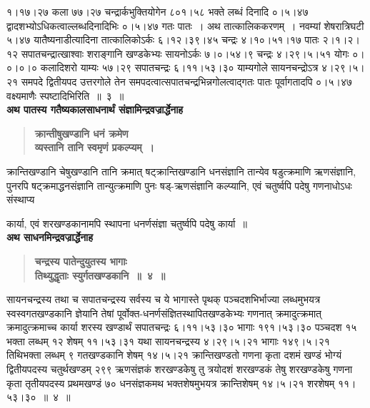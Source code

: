 \documentclass[11pt, openany]{book}
\begin{document}
\begin{sloppypar}
\noindent १।१७।२७ कला ७७।२७ चन्द्रार्कभुक्तियोगेन ८०१।५८ भक्ते लब्धं दिनादि ०।५।४७ द्वादशभ्योऽधिकत्वाल्लब्धदिनादिभिः ०।५।४७ गतः पातः~। अथ तात्कालिककरणम्~। नवम्यां शेषरात्रिघटी ५।४७ यातैष्यनाडीत्यादिना तात्कालिकोऽर्कः ६।१२।३९।४५ चन्द्रः ४।१०।५१।१७ पातः २।१।२।१२ सपातचन्द्रात्खाश्वाः शराङ्गानि खण्डकेभ्यः सायनोऽर्कः ७।०।५४।९ चन्द्रः ४।२९।५।५१ योगः ०।०।०।० कलादिशरो याम्यः ५७।२९ सपातचन्द्रः ६।११।५३।३० याम्यगोले सायनचन्द्रोऽत्र ४।२९।५।२१ समपदे द्वितीयपद उत्तरगोले तेन समपदत्वात्सपातचन्द्रभिन्नगोलत्वाद्गतः पातः पूर्वागतादपि ०।५।४७ वक्ष्यमाणैः स्पष्टादिभिरिति~॥~३~॥\\

{\small \textbf{अथ पातस्य गतैष्यकालसाधनार्थं संज्ञामिन्द्रवज्रार्द्धेनाह\textendash }}

 \label{9.4.1}
\begin{quote}
{\large \textbf{{\color{purple}क्रान्तीषुखण्डानि धनं क्रमेण \\
व्यस्तानि तानि स्वमृणं प्रकल्प्यम्~।}}}
\end{quote}

क्रान्तिखण्डानि चेषुखण्डानि तानि क्रमात् षट्क्रान्तिखण्डानि धनसंज्ञानि तान्येव षडुत्क्रमाणि ऋणसंज्ञानि, पुनरपि षट्क्रमाद्धनसंज्ञानि तान्युत्क्रमाणि पुनः षड्-ऋणसंज्ञानि कल्प्यानि, एवं चतुर्ष्वपि पदेषु गणनाधोऽधः संस्थाप्य
\end{sloppypar}

\newpage

\begin{sloppypar}
\noindent कार्या, एवं शरखण्डकानामपि स्थापना धनर्णसंज्ञा चतुर्ष्वपि पदेषु कार्या~॥\\

{\small \textbf{अथ साधनमिन्द्रवज्रार्द्धेनाह\textendash }}

 \label{9.4}
\begin{quote}
{\large \textbf{{\color{purple}चन्द्रस्य पातेन्दुयुतस्य भागाः\\
तिथ्युद्धृताः स्युर्गतखण्डकानि~॥~४~॥}}}
\end{quote}

सायनचन्द्रस्य तथा च सपातचन्द्रस्य सर्वस्य च ये भागास्ते पृथक् पञ्चदशभिर्भाज्या लब्धमुभयत्र स्वस्वगतखण्डकानि ज्ञेयानि तेषां पूर्वोक्त-धनर्णसंज्ञितस्थापितखण्डकेभ्यः गणनात् क्रमादुत्क्रमात् क्रमादुत्क्रमाच्च कार्या शरस्य खण्डार्थं सपातचन्द्रः ६।११।५३।३० भागाः १९१।५३।३० पञ्चदश १५ भक्ता लब्धम् १२ शेषम् ११।५३।३१ यथा सायनचन्द्रस्य ४।२९।५।२१ भागाः १४९।५।२१ तिथिभक्ता लब्धम् ९ गतखण्डकानि शेषम् १४।५।२१ क्रान्तिखण्डतो गणना कृता दशमं खण्डं भोग्यं द्वितीयपदस्य चतुर्थखण्डम् २९९ ऋणसंज्ञकं शरखण्डकेषु तु त्रयोदशं शरखण्डकं तेषु शरखण्डकेषु गणना कृता तृतीयपदस्य प्रथमखण्डं ७० धनसंज्ञकमथ भक्तशेषमुभयत्र क्रान्तिशेषम् १४।५।२१ शरशेषम् ११।५३।३०~॥~४~॥\\
\end{sloppypar}
\end{document}
